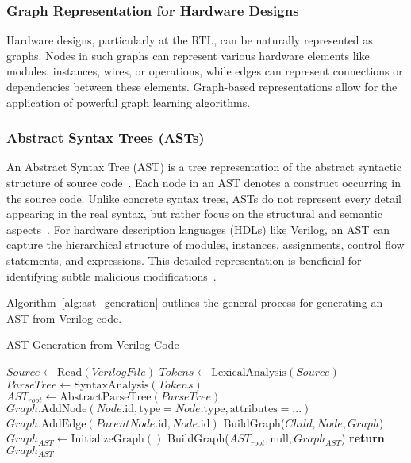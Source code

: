 \documentclass[sigplan,screen]{acmart}
\begin{document}
\subsubsection{Graph Representation for Hardware Designs}
Hardware designs, particularly at the RTL, can be naturally represented as graphs. Nodes in such graphs can represent various hardware elements like modules, instances, wires, or operations, while edges can represent connections or dependencies between these elements. Graph-based representations allow for the application of powerful graph learning algorithms.

\subsubsection{Abstract Syntax Trees (ASTs)}
An Abstract Syntax Tree (AST) is a tree representation of the abstract syntactic structure of source code~\cite{aho2007compilers}. Each node in an AST denotes a construct occurring in the source code. Unlike concrete syntax trees, ASTs do not represent every detail appearing in the real syntax, but rather focus on the structural and semantic aspects~\cite{necula2002cil}. For hardware description languages (HDLs) like Verilog, an AST can capture the hierarchical structure of modules, instances, assignments, control flow statements, and expressions. This detailed representation is beneficial for identifying subtle malicious modifications~\cite{yamaguchi2014modeling}.

Algorithm~\ref{alg:ast_generation} outlines the general process for generating an AST from Verilog code.

\begin{algorithm}
\caption{AST Generation from Verilog Code}
\label{alg:ast_generation}
\begin{algorithmic}[1]
    \State $Source \gets \text{Read}(VerilogFile)$
    \State $Tokens \gets \text{LexicalAnalysis}(Source)$
    \State $ParseTree \gets \text{SyntaxAnalysis}(Tokens)$
    \State $AST_{root} \gets \text{AbstractParseTree}(ParseTree)$
        \State $Graph.\text{AddNode}(Node.\text{id}, \text{type}=Node.\text{type}, \text{attributes}=...)$
            \State $Graph.\text{AddEdge}(ParentNode.\text{id}, Node.\text{id})$
        \EndIf
            \State BuildGraph($Child, Node, Graph$)
        \EndFor
    \EndFunction
    \State $Graph_{AST} \gets \text{InitializeGraph}()$
    \State BuildGraph($AST_{root}, \text{null}, Graph_{AST}$)
    \State \textbf{return} $Graph_{AST}$
\EndProcedure
\end{algorithmic}
\end{algorithm}
\end{document}
